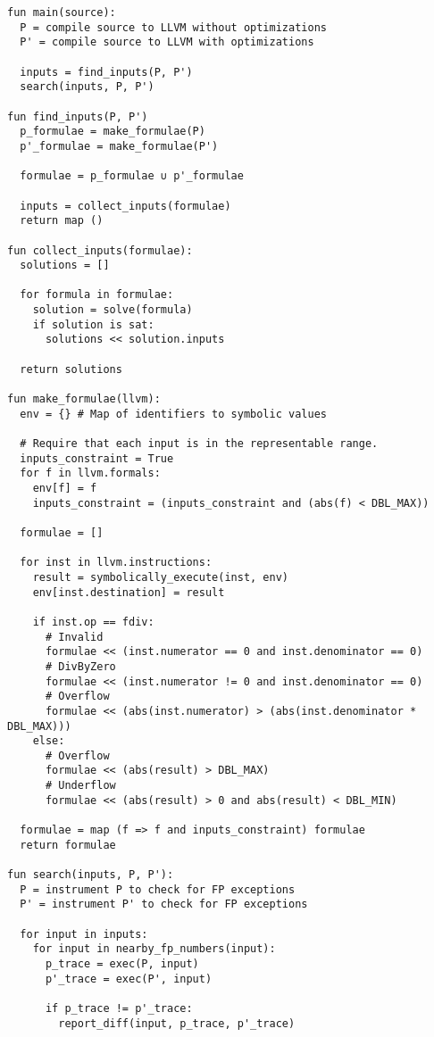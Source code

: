 \documentclass{article}
\begin{document}
\begin{lstlisting}
fun main(source):
  P = compile source to LLVM without optimizations
  P' = compile source to LLVM with optimizations

  inputs = find_inputs(P, P')
  search(inputs, P, P')

fun find_inputs(P, P')
  p_formulae = make_formulae(P)
  p'_formulae = make_formulae(P')

  formulae = p_formulae ∪ p'_formulae

  inputs = collect_inputs(formulae)
  return map ()

fun collect_inputs(formulae):
  solutions = []

  for formula in formulae:
    solution = solve(formula)
    if solution is sat:
      solutions << solution.inputs

  return solutions

fun make_formulae(llvm):
  env = {} # Map of identifiers to symbolic values

  # Require that each input is in the representable range.
  inputs_constraint = True
  for f in llvm.formals:
    env[f] = f
    inputs_constraint = (inputs_constraint and (abs(f) < DBL_MAX))

  formulae = []

  for inst in llvm.instructions:
    result = symbolically_execute(inst, env)
    env[inst.destination] = result

    if inst.op == fdiv:
      # Invalid
      formulae << (inst.numerator == 0 and inst.denominator == 0)
      # DivByZero
      formulae << (inst.numerator != 0 and inst.denominator == 0)
      # Overflow
      formulae << (abs(inst.numerator) > (abs(inst.denominator * DBL_MAX)))
    else:
      # Overflow
      formulae << (abs(result) > DBL_MAX)
      # Underflow
      formulae << (abs(result) > 0 and abs(result) < DBL_MIN)

  formulae = map (f => f and inputs_constraint) formulae
  return formulae

fun search(inputs, P, P'):
  P = instrument P to check for FP exceptions
  P' = instrument P' to check for FP exceptions

  for input in inputs:
    for input in nearby_fp_numbers(input):
      p_trace = exec(P, input)
      p'_trace = exec(P', input)

      if p_trace != p'_trace:
        report_diff(input, p_trace, p'_trace)
\end{lstlisting}

\printbibheading
\printbibliography
\end{document}
